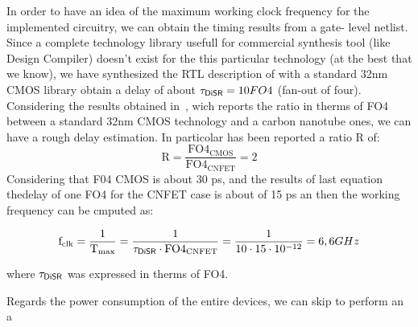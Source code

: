 In order to have an idea of the maximum working clock frequency for the
implemented circuitry, we can obtain the timing results from a gate-
level netlist. Since a complete technology library usefull for 
commercial synthesis tool (like Design Compiler) doesn't exist for the this particular technology
(at the best that we know), we have synthesized the RTL description of \disr{}
with a standard 32nm CMOS library obtain 
a delay of about $\mathrm{\tau_{{\sf DiSR}{}}=10} FO4$ (fan-out of four).
Considering the results obtained in~\cite{deng_isscc07}, wich reports the
ratio in therms of FO4 between a standard 32nm CMOS technology and a
carbon nanotube ones, we can have a rough delay estimation.
In particolar has been reported a ratio R of: 
\begin{equation}
\mathrm{R=\frac{FO4_{CMOS}}{FO4_{CNFET}}=2} 
\end{equation}
Considering that F04 CMOS is about 30 ps, and the results of  
last equation thedelay of one FO4 for the CNFET case is about of
15 ps an then the working frequency can be cmputed as:

\begin{equation}
\mathrm{f_{clk}=\frac{1}{T_{max}}=\frac{1}{\tau_{{\sf DiSR}{}} \cdot FO4_{CNFET}}}=
\frac{1}{10\cdot 15 \cdot 10^{-12}}=6,6 GHz
\end{equation}

where $\mathrm{\tau_{{\sf DiSR}{}}}$ was expressed in therms of FO4.

Regards the power
consumption of the entire \disr{} devices, we can skip to perform an a




